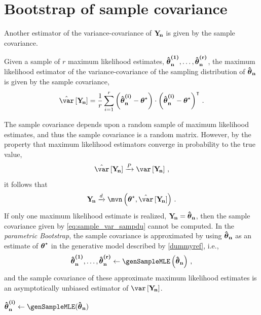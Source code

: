 \documentclass[
    11pt,
    extrafontsizes,
    article,
    oldfontcommands,
    final,
    oneside,
    openany,
    hidelinks]{memoir}
\begin{document}
\chapter{Bootstrap of sample covariance}
Another estimator of the variance-covariance of $\mathrm{\boldsymbol{\mathbf{Y_{\!n}}}}$ is given by the sample covariance.
\begin{definition}
	Given a sample of $r$ maximum likelihood estimates, $\boldsymbol{\mathbf{\hat{\boldsymbol{\mathbf{\theta}}}_{n}^{(1)}}}, \ldots, \boldsymbol{\mathbf{\hat{\boldsymbol{\mathbf{\theta}}}_{n}^{(r)}}}$, the maximum likelihood estimator of the variance-covariance of the sampling distribution of $\boldsymbol{\mathbf{\hat{\boldsymbol{\mathbf{\theta}}}_{n}}}$ is given by the sample covariance,
	\begin{align}
	\label{eq:sample_var_sampd}
	\estimator{\var}\left[\sampdu\right] = \frac{1}{r}
	\sum_{i=1}^{r}
	\left(\mleui{i} - \tparam\sysparamvec\right) \cdot
	\left(\mleui{i} - \tparam\sysparamvec\right)^{\intercal}\,.
	\end{align}
\end{definition}
The sample covariance depends upon a random sample of maximum likelihood estimates, and thus the sample covariance is a random matrix. However, by the property that maximum likelihood estimators converge in probability to the true value,
\begin{equation}
\estimator\var\left[\sampdu\right] \xrightarrow{P} \var\left[\sampdu\right]\,,
\end{equation}
it follows that
\begin{equation}
\sampdu \xrightarrow{d} \mvn\left(\tparam\sysparamvec, \estimator\var\left[\sampdu\right]\right)\,.
\end{equation}
If only one maximum likelihood estimate is realized, $\mathrm{\boldsymbol{\mathbf{Y_{\!n}}}} = \boldsymbol{\mathbf{\hat{\boldsymbol{\mathbf{\theta}}}_{n}}}$, then 
the sample covariance given by \cref{eq:sample_var_sampdu} cannot be computed. 
In the \emph{parametric Bootstrap}, the sample covariance is approximated by 
using $\boldsymbol{\mathbf{\hat{\boldsymbol{\mathbf{\theta}}}_{n}}}$ as an estimate of ${\boldsymbol{\mathbf{\theta}}}^{\star}$ in the generative model 
described by \cref{dummyref}, i.e.,
\begin{equation}
\mleui{1}, \ldots, \mleui{r} \gets \genSampleMLE\left(\mleu\right)\,,
\end{equation}
and the sample covariance of these approximate maximum likelihood estimates is an asymptotically unbiased estimator of $\var\left[\sampdu\right]$.

\begin{algorithm}
	\DontPrintSemicolon
	\BlankLine
	{
		{
			$\mleui{i} \gets \genSampleMLE(\mleu)$\;
		}
	}
	\caption{Sample covariance of a bootstrapped sample of maximum likelihood estimates.}
	\label{alg:samp_du_gen_model}
\end{algorithm}
\end{document}

